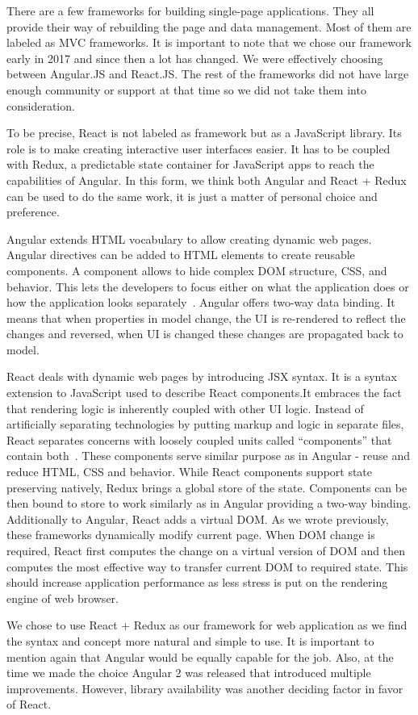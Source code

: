 There are a few frameworks for building single-page applications. They all provide their way of rebuilding the page and data management. Most of them are labeled as MVC frameworks. It is important to note that we chose our framework early in 2017 and since then a lot has changed. We were effectively choosing between Angular.JS and React.JS. The rest of the frameworks did not have large enough community or support at that time so we did not take them into consideration.
\par
To be precise, React is not labeled as framework but as a JavaScript library. Its role is to make creating interactive user interfaces easier. It has to be coupled with Redux, a predictable state container for JavaScript apps to reach the capabilities of Angular. In this form, we think both Angular and React + Redux can be used to do the same work, it is just a matter of personal choice and preference.
\par
Angular extends HTML vocabulary to allow creating dynamic web pages. Angular directives can be added to HTML elements to create reusable components. A component allows to hide complex DOM structure, CSS, and behavior. This lets the developers to focus either on what the application does or how the application looks separately~\citep{angular}. Angular offers two-way data binding. It means that when properties in model change, the UI is re-rendered to reflect the changes and reversed, when UI is changed these changes are propagated back to model.
\par
React deals with dynamic web pages by introducing JSX syntax. It is a syntax extension to JavaScript used to describe React components.It embraces the fact that rendering logic is inherently coupled with other UI logic. Instead of artificially separating technologies by putting markup and logic in separate files, React separates concerns with loosely coupled units called “components” that contain both~\citep{reactJSX}. These components serve similar purpose as in Angular - reuse and reduce HTML, CSS and behavior. While React components support state preserving natively, Redux brings a global store of the state. Components can be then bound to store to work similarly as in Angular providing a two-way binding. Additionally to Angular, React adds a virtual DOM. As we wrote previously, these frameworks dynamically modify current page. When DOM change is required, React first computes the change on a virtual version of DOM and then computes the most effective way to transfer current DOM to required state. This should increase application performance as less stress is put on the rendering engine of web browser.
\par
We chose to use React + Redux as our framework for web application as we find the syntax and concept more natural and simple to use. It is important to mention again that Angular would be equally capable for the job. Also, at the time we made the choice Angular 2 was released that introduced multiple improvements. However, library availability was another deciding factor in favor of React.

